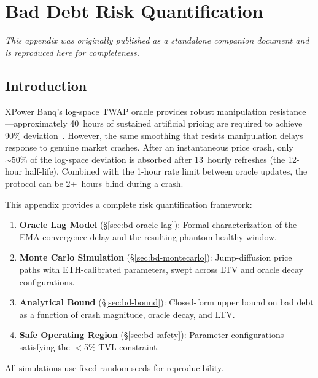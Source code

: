 \documentclass[10pt,a4paper,twocolumn]{article}
\begin{document}
\section{Bad Debt Risk Quantification}
\label{apx:bad-debt}

\noindent\textit{This appendix was originally published as a standalone companion document and is reproduced here for completeness.}

\subsection{Introduction}
\label{sec:bd-intro}

XPower Banq's log-space TWAP oracle provides robust manipulation resistance---approximately 40~hours of sustained artificial pricing are required to achieve 90\% deviation~\cite{mackinga2022}. However, the same smoothing that resists manipulation delays response to genuine market crashes. After an instantaneous price crash, only ${\sim}50\%$ of the log-space deviation is absorbed after 13~hourly refreshes (the 12-hour half-life). Combined with the 1-hour rate limit between oracle updates, the protocol can be 2+~hours blind during a crash.

This appendix provides a complete risk quantification framework:
\begin{enumerate}[leftmargin=*]
\item \textbf{Oracle Lag Model} (\S\ref{sec:bd-oracle-lag}): Formal characterization of the EMA convergence delay and the resulting phantom-healthy window.
\item \textbf{Monte Carlo Simulation} (\S\ref{sec:bd-montecarlo}): Jump-diffusion price paths with ETH-calibrated parameters, swept across LTV and oracle decay configurations.
\item \textbf{Analytical Bound} (\S\ref{sec:bd-bound}): Closed-form upper bound on bad debt as a function of crash magnitude, oracle decay, and LTV.
\item \textbf{Safe Operating Region} (\S\ref{sec:bd-safety}): Parameter configurations satisfying the $<$5\% TVL constraint.
\end{enumerate}

All simulations use fixed random seeds for reproducibility.

\end{document}
